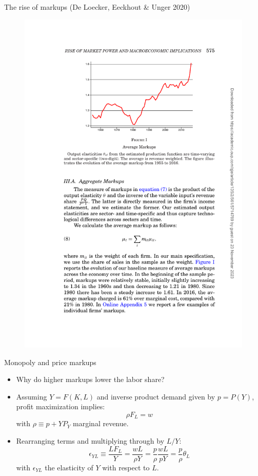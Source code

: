 \documentclass[notes=show]{beamer}
\begin{document}
\begin{frame}{The rise of markups (De Loecker, Eeckhout \& Unger 2020)}
\begin{figure}[p!]
 \includegraphics[width=\textwidth]{figure-LEU-1.pdf} 
\end{figure}
\end{frame}

\begin{frame}{Monopoly and price markups}
\begin{itemize}
\item Why do higher markups lower the labor share? \medskip
\item Assuming $ Y= F(K,L)$ and inverse product demand given by $p=P(Y)$, profit maximization implies:
\begin{equation*}
    \rho F_{L} = w
\end{equation*}
with $ \rho \equiv p+YP_{Y}$ marginal revenue.
\item Rearranging terms and multiplying through by $L/Y$:
\begin{equation*}
    \epsilon_{YL} \equiv \frac{LF_{L}}{Y} = \frac{wL}{\rho Y} = \frac{p}{\rho} \frac{wL}{pY} = \frac{p}{\rho} \theta_{L}
\end{equation*}
with $  \epsilon_{YL}$ the elasticity of $Y$ with respect to $L$.
\end{itemize}
\end{frame}
\end{document}
